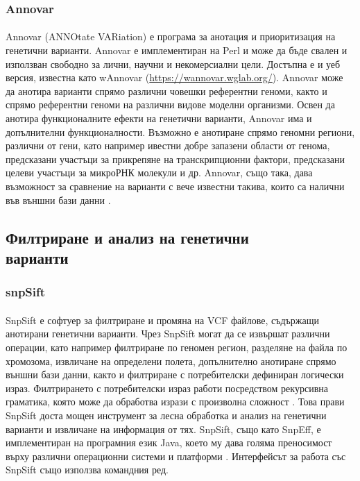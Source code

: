 \documentclass[pdftex,cyrillic,14pt,a4page,twoside,openright]{extreport}
\begin{document}
\subsubsection{Annovar}
\paragraph{}
Annovar (ANNOtate VARiation) е програма за анотация и приоритизация на генетични варианти. Annovar е имплементиран на Perl и може да бъде свален и използван свободно за лични, научни и некомерсиални цели. Достъпна е и уеб версия, известна като wAnnovar (\url{https://wannovar.wglab.org/}). Annovar може да анотира варианти спрямо различни човешки референтни геноми, както и спрямо референтни геноми на различни видове моделни организми. Освен да анотира функционалните ефекти на генетични варианти, Annovar има и допълнителни функционалности. Възможно е анотиране спрямо геномни региони, различни от гени, като например ивестни добре запазени области от генома, предсказани участъци за прикрепяне на транскрипционни фактори, предсказани целеви участъци за микроРНК молекули и др. Annovar, също така, дава възможност за сравнение на варианти с вече известни такива, които са налични във външни бази данни \cite{wang2010}.

\subsection[Филтриране и анализ на генетични варианти]{Филтриране и анализ на генетични\\ варианти}
\subsubsection{snpSift}
\paragraph{}
SnpSift е софтуер за филтриране и промяна на VCF файлове, съдържащи анотирани генетични варианти. Чрез SnpSift могат да се извършат различни операции, като например филтриране по геномен регион, разделяне на файла по хромозома, извличане на определени полета, допълнително анотиране спрямо външни бази данни, както и филтриране с потребителски дефиниран логически израз. Филтрирането с потребителски израз работи посредством рекурсивна граматика, която може да обработва изрази с произволна сложност \cite{cingolani2012sift}. Това прави SnpSift доста мощен инструмент за лесна обработка и анализ на генетични варианти и извличане на информация от тях. SnpSift, също като SnpEff, е имплементиран на програмния език Java, което му дава голяма преносимост върху различни операционни системи и платформи \cite[стр. 9-10]{schildt2020complete}. Интерфейсът за работа със SnpSift също използва командния ред.
\end{document}
